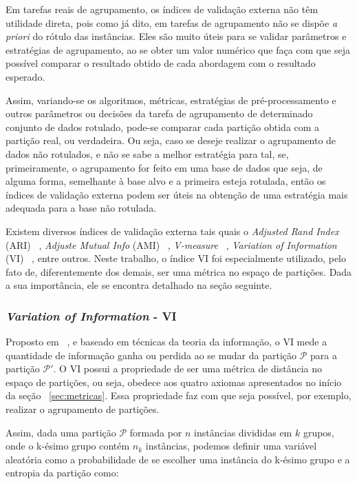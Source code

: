 Em tarefas reais de agrupamento, os índices de validação externa não têm utilidade direta, pois como já dito, em tarefas de agrupamento não se dispõe \emph{a priori} do rótulo das instâncias. Eles são muito úteis para se validar parâmetros e estratégias de agrupamento, ao se obter um valor numérico que faça com que seja possível comparar o resultado obtido  de cada abordagem com o resultado esperado.

Assim, variando-se os algoritmos, métricas, estratégias de pré-processamento e outros parâmetros ou decisões da tarefa de agrupamento de determinado conjunto de dados rotulado, pode-se comparar cada partição obtida com a partição real, ou verdadeira. Ou seja, caso se deseje realizar o agrupamento de dados não rotulados, e não se sabe a melhor estratégia para tal, se, primeiramente,  o agrupamento for feito em uma base de dados que seja, de alguma forma, semelhante à base alvo e a primeira esteja rotulada, então os índices de validação externa podem ser úteis na obtenção de uma estratégia mais adequada para a base não rotulada. %

Existem diversos índices de validação externa tais quais o \emph{Adjusted Rand Index} (ARI) ~\parencite{Hubert1985}, \emph{Adjuste Mutual Info } (AMI) ~\parencite{AMI}, \emph{V-measure} ~\parencite{V_measure}, \emph{Variation of Information} (VI) ~\parencite{Meila}, entre outros. Neste trabalho, o índice VI foi especialmente utilizado, pelo fato de, diferentemente dos demais, ser uma métrica no espaço de partições. Dada a sua importância, ele se encontra detalhado na seção seguinte.


\subsubsection{\emph{Variation of Information} - VI} \label{sec:VI}

Proposto em ~\parencite{Meila}, e baseado em técnicas da teoria da informação, o VI mede a quantidade de informação ganha ou perdida ao se mudar da partição $\mathcal{P}$ para a partição $\mathcal{P'}$. O VI possui a propriedade de ser uma métrica de distância no espaço de partições, ou seja, obedece aos quatro axiomas apresentados no início da seção ~\ref{sec:metricas}. Essa propriedade faz com que seja possível, por exemplo, realizar o agrupamento de partições. 

Assim, dada uma partição $\mathcal{P}$ formada por $n$ instâncias divididas em $k$ grupos, onde o k-ésimo grupo contém $n_k$ instâncias, podemos definir uma variável aleatória como a probabilidade de se escolher uma instância do k-ésimo grupo e a entropia da partição como:

